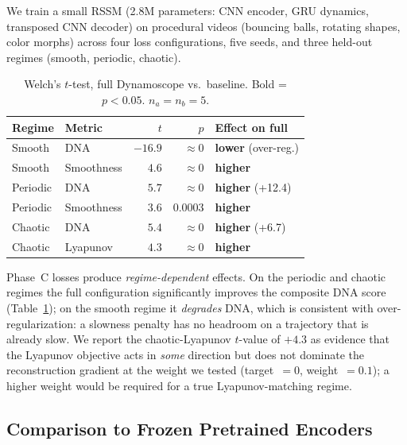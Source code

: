 \documentclass[11pt,a4paper]{article}
\begin{document}
We train a small RSSM (2.8M parameters: CNN encoder, GRU dynamics,
transposed CNN decoder) on procedural videos (bouncing balls,
rotating shapes, color morphs) across four loss configurations,
five seeds, and three held-out regimes (smooth, periodic, chaotic).

\begin{table}[h]
\centering
\caption{Welch's $t$-test, full Dynamoscope vs.\ baseline. Bold = $p<0.05$. $n_a = n_b = 5$.}
\label{tab:welch}
\begin{tabular}{llrrl}
\toprule
Regime & Metric & $t$ & $p$ & Effect on full \\
\midrule
Smooth & DNA & $-16.9$ & $\approx 0$ & \textbf{lower} (over-reg.) \\
Smooth & Smoothness & $4.6$ & $\approx 0$ & \textbf{higher} \\
Periodic & DNA & $5.7$ & $\approx 0$ & \textbf{higher} (+12.4) \\
Periodic & Smoothness & $3.6$ & $0.0003$ & \textbf{higher} \\
Chaotic & DNA & $5.4$ & $\approx 0$ & \textbf{higher} (+6.7) \\
Chaotic & Lyapunov & $4.3$ & $\approx 0$ & \textbf{higher} \\
\bottomrule
\end{tabular}
\end{table}

Phase~C losses produce \emph{regime-dependent} effects.  On the
periodic and chaotic regimes the full configuration significantly
improves the composite DNA score (Table~\ref{tab:welch}); on
the smooth regime it \emph{degrades} DNA, which is consistent with
over-regularization: a slowness penalty has no headroom on a
trajectory that is already slow.  We report the chaotic-Lyapunov
$t$-value of $+4.3$ as evidence that the Lyapunov objective acts in
\emph{some} direction but does not dominate the reconstruction
gradient at the weight we tested (target~$=0$, weight~$=0.1$); a
higher weight would be required for a true Lyapunov-matching regime.

\subsection{Comparison to Frozen Pretrained Encoders}
\end{document}

